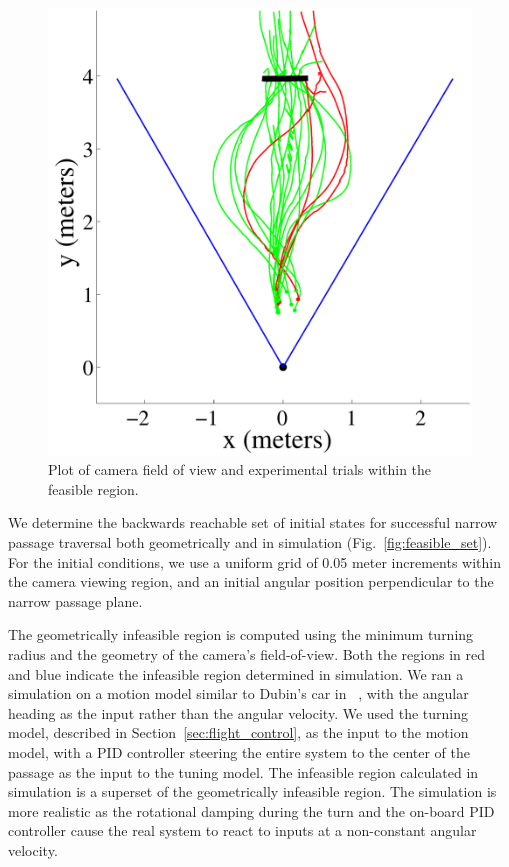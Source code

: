 \documentclass{aamas2013}
\begin{document}
\begin{figure}[tb]
\centering
\includegraphics[width=\linewidth]{figures/flight_paths_feasible.pdf}
\caption{Plot of camera field of view and experimental trials within the feasible region.}
\label{fig:flight_paths_feasible}
\end{figure}

We determine the backwards reachable set of initial states for successful
narrow passage traversal both geometrically and in simulation 
(Fig.~\ref{fig:feasible_set}). For the initial conditions, we use a uniform 
grid of 0.05 meter increments within the camera viewing region, and an 
initial angular position perpendicular to the narrow passage plane. 

The geometrically infeasible region is computed using the minimum
turning radius and the geometry of the camera's field-of-view. Both the 
regions in red and blue indicate the infeasible region determined in simulation. 
We ran a simulation on a motion model similar to Dubin's car in ~\cite{lavalle:planning}, with the
angular heading as the input rather than the angular velocity. We used the
turning model, described in Section~\ref{sec:flight_control}, as the input to
the motion model, with a PID controller steering the entire system to the
center of the passage as the input to the tuning model. The infeasible region
calculated in simulation is a superset of the geometrically infeasible region.
The simulation is more realistic as the rotational damping during the turn and
the on-board PID controller cause the real system to react to inputs at a
non-constant angular velocity.
\end{document}

